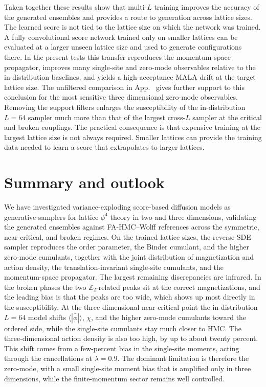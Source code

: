 \documentclass[reprint,twocolumn,superscriptaddress,preprintnumbers,amsmath,amssymb,aps,prd,floatfix]{revtex4-2}
\def\App#1{App.~\labelcref{#1}}
\begin{document}
Taken together these results show that multi-$L$ training improves the accuracy of the generated ensembles and provides a route to generation across lattice sizes. The learned score is not tied to the lattice size on which the network was trained. A fully convolutional score network trained only on smaller lattices can be evaluated at a larger unseen lattice size and used to generate configurations there. In the present tests this transfer reproduces the momentum-space propagator, improves many single-site and zero-mode observables relative to the in-distribution baselines, and yields a high-acceptance MALA drift at the target lattice size. The unfiltered comparison in \App{app:numerical_tables} gives further support to this conclusion for the most sensitive three dimensional zero-mode observables. Removing the support filters enlarges the susceptibility of the in-distribution $L=64$ sampler much more than that of the largest cross-$L$ sampler at the critical and broken couplings. The practical consequence is that expensive training at the largest lattice size is not always required. Smaller lattices can provide the training data needed to learn a score that extrapolates to larger lattices.

\section{Summary and outlook}
\label{sec:summary}

We have investigated variance-exploding score-based diffusion models as generative samplers for lattice $\phi^4$ theory in two and three dimensions, validating the generated ensembles against FA-HMC--Wolff references across the symmetric, near-critical, and broken regimes. On the trained lattice sizes, the reverse-SDE sampler reproduces the order parameter, the Binder cumulant, and the higher zero-mode cumulants, together with the joint distribution of magnetization and action density, the translation-invariant single-site cumulants, and the momentum-space propagator. The largest remaining discrepancies are infrared. In the broken phases the two $\mathbb{Z}_2$-related peaks sit at the correct magnetizations, and the leading bias is that the peaks are too wide, which shows up most directly in the susceptibility. At the three-dimensional near-critical point the in-distribution $L=64$ model shifts $\langle|\bar\phi|\rangle$, $\chi$, and the higher zero-mode cumulants toward the ordered side, while the single-site cumulants stay much closer to HMC. The three-dimensional action density is also too high, by up to about twenty percent. This shift comes from a few-percent bias in the single-site moments, acting through the cancellations at $\lambda=0.9$. The dominant limitation is therefore the zero-mode, with a small single-site moment bias that is amplified only in three dimensions, while the finite-momentum sector remains well controlled.
\end{document}
